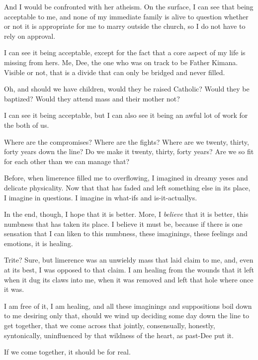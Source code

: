 And I would be confronted with her atheism. On the surface, I can see that being acceptable to me, and none of my immediate family is alive to question whether or not it is appropriate for me to marry outside the church, so I do not have to rely on approval.

I can see it being acceptable, except for the fact that a core aspect of my life is missing from hers. Me, Dee, the one who was on track to be Father Kimana. Visible or not, that is a divide that can only be bridged and never filled.

Oh, and should we have children, would they be raised Catholic? Would they be baptized? Would they attend mass and their mother not?

I can see it being acceptable, but I can also see it being an awful lot of work for the both of us.

Where are the compromises? Where are the fights? Where are we twenty, thirty, forty years down the line? Do we make it twenty, thirty, forty years? Are we so fit for each other than we can manage that?

Before, when limerence filled me to overflowing, I imagined in dreamy yeses and delicate physicality. Now that that has faded and left something else in its place, I imagine in questions. I imagine in what-ifs and is-it-actuallys.

In the end, though, I hope that it is better. More, I \emph{believe} that it is better, this numbness that has taken its place. I believe it must be, because if there is one sensation that I can liken to this numbness, these imaginings, these feelings and emotions, it is healing.

Trite? Sure, but limerence was an unwieldy mass that laid claim to me, and, even at its best, I was opposed to that claim. I am healing from the wounds that it left when it dug its claws into me, when it was removed and left that hole where once it was.

I am free of it, I am healing, and all these imaginings and suppositions boil down to me desiring only that, should we wind up deciding some day down the line to get together, that we come across that jointly, consensually, honestly, syntonically, uninfluenced by that wildness of the heart, as past-Dee put it.

If we come together, it should be for real.

\section{}

